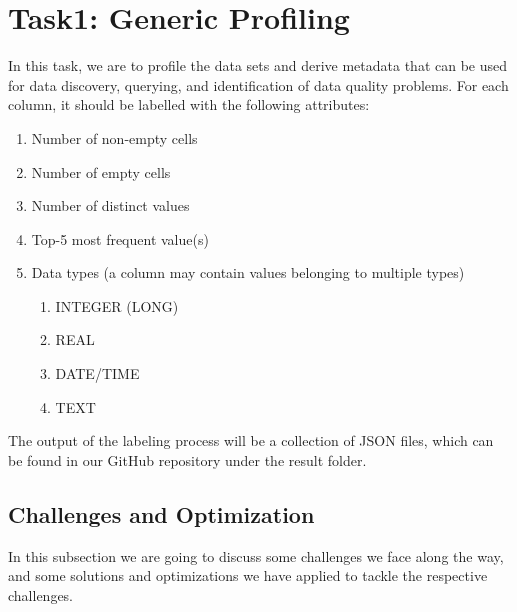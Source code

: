 \documentclass[sigconf]{acmart}
\begin{document}
\section{Task1: Generic Profiling}
In this task,  we are to profile the data sets and derive metadata that can be used for data discovery, querying, and identification of data quality problems. For each column, it should be labelled with the following attributes:
\begin{enumerate}
    \item Number of non-empty cells
    \item Number of empty cells
    \item Number of distinct values
    \item Top-5 most frequent value(s)
    \item Data types (a column may contain values belonging to multiple types)
    \begin{enumerate}
        \item INTEGER (LONG)
        \item REAL
        \item DATE/TIME
        \item TEXT
    \end{enumerate}
\end{enumerate}
The output of the labeling process will be a collection of JSON files, which can be found in our GitHub repository under the result folder.
\subsection{Challenges and Optimization}
In this subsection we are going to discuss some challenges we face along the way, and some solutions and optimizations we have applied to tackle the respective challenges.
\end{document}
